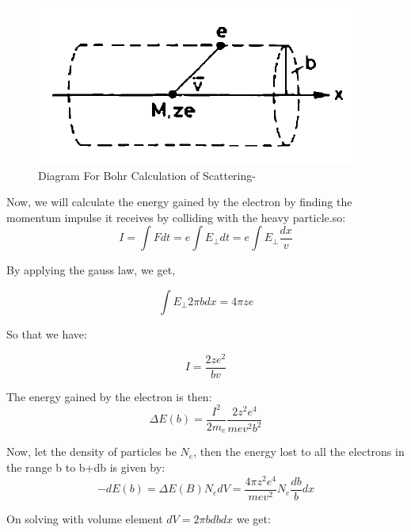 \documentclass{article}
\begin{document}
\begin{multicols}{2}
\begin{figure}[H]
    \centering	
     \includegraphics[width=\columnwidth]{bohrsct.png}
     \caption{Diagram For Bohr Calculation of Scattering-\cite{leo1988techniques}}
     \label{bohrsct1}
\end{figure}


Now, we will calculate the energy gained by the electron by finding the momentum impulse
it receives by colliding with the heavy particle.so:
\begin{equation}
    I = \int F dt = e\int E_{\perp} dt =e\int E_{\perp} \frac{dx}{v}
\end{equation}



By applying the gauss law, we get,

\begin{equation}
    \int E_{\perp} 2\pi bdx = 4\pi ze 
\end{equation}

So that we have:

\begin{equation}
    I = \frac{2ze^2}{bv}
\end{equation}

The energy gained by the electron is then:
\begin{equation}
    \label{eq1}
    \Delta E(b) = \frac{I^2}{2m_e} \frac{2z^2e^4}{mev^2b^2}
\end{equation}

Now, let the density of particles be $N_e$, then the energy lost to all the electrons
in the range b to b+db is given by:
\begin{equation}
    -dE(b) = \Delta E(B) N_e dV = \frac{4\pi z^2e^4}{mev^2} N_e \frac{db}{b} dx
\end{equation}

On solving with volume element $dV = 2\pi b db dx$ we get:


\end{multicols}
\end{document}
